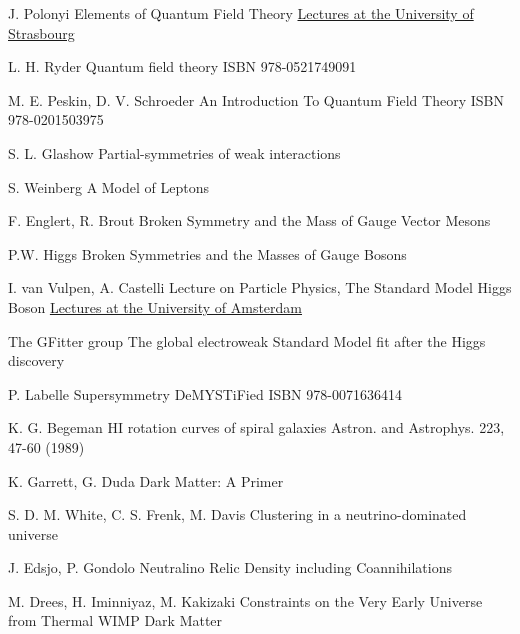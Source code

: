 

{J. Polonyi}
{Elements of Quantum Field Theory}
{\href{http://www-physique.u-strasbg.fr/~polonyi/}{Lectures at the University of Strasbourg}}

{L. H. Ryder}
{Quantum field theory}
{ISBN 978-0521749091}

{M. E. Peskin, D. V. Schroeder}
{An Introduction To Quantum Field Theory}
{ISBN 978-0201503975}

{S. L. Glashow}
{Partial-symmetries of weak interactions}
{}

{S. Weinberg}
{A Model of Leptons}
{}

{F. Englert, R. Brout}
{Broken Symmetry and the Mass of Gauge Vector Mesons}
{}

{P.W. Higgs}
{ Broken Symmetries and the Masses of Gauge Bosons}
{}

{I. van Vulpen, A. Castelli}
{Lecture on Particle Physics, The Standard Model Higgs Boson}
{\href{http://www.nikhef.nl/~ivov/Ivo_teaching.html}{Lectures at the University of Amsterdam}}

{The GFitter group}
{The global electroweak Standard Model fit after the Higgs discovery}
{}

{P. Labelle}
{Supersymmetry DeMYSTiFied}
{ISBN 978-0071636414}

{K. G. Begeman}
{HI rotation curves of spiral galaxies}
{Astron. and Astrophys. 223, 47-60 (1989)}

{K. Garrett, G. Duda}
{Dark Matter: A Primer}
{}

{S. D. M. White, C. S. Frenk, M. Davis}
{Clustering in a neutrino-dominated universe}
{}

{J. Edsjo, P. Gondolo}
{Neutralino Relic Density including Coannihilations}
{}

{M. Drees, H. Iminniyaz, M. Kakizaki}
{Constraints on the Very Early Universe from Thermal WIMP Dark Matter}
{}

